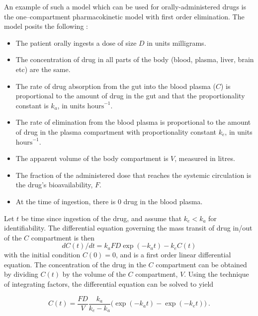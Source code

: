 An example of such a model which can be used for orally-administered drugs is the one--compartment pharmacokinetic model with first order elimination.  The model posits the following \cite{wakefield1992bayesian}:  
%
\begin{itemize}
	
\item The patient orally ingests a dose of size $D$ in units milligrams.

\item The concentration of drug in all parts of the body (blood, plasma, liver, brain etc) are the same.

\item The rate of drug absorption from the gut  into the blood plasma ($ C $) is proportional to the amount of drug in the gut and that the proportionality constant is $ k_a $, in units $ \text{hours}^{-1} $.

\item The rate of elimination from the blood plasma is proportional to the amount of drug in the plasma compartment with proportionality constant $ k_e $, in units $ \text{hours}^{-1} $.

\item The apparent volume of the body compartment is $V$, measured in litres.

\item The fraction of the administered dose that reaches the systemic circulation is the drug’s bioavailability, $F$.

\item At the time of ingestion, there is 0 drug in the blood plasma.
\end{itemize}

Let $t$ be time since ingestion of the drug, and assume that $k_e < k_a$ for identifiability.  The differential equation governing the mass transit of drug in/out of the $C$ compartment is then 
\begin{equation}  \label{pkpd_ode}
dC(t)/dt = k_aFD\exp(-k_a t) - k_eC(t) 
\end{equation}
\noindent with the initial condition $C(0) = 0$, and is a first order linear differential equation.  The concentration of the drug in the $C$ compartment can be obtained by dividing $C(t)$ by the volume of the $C$ compartment, $V$.  Using the technique of integrating factors, the differential equation can be solved to yield

\begin{equation}\label{onecompartment_PKPD_model}
	C(t) = \dfrac{F D}{V}\dfrac{k_a}{k_e - k_a}\Big(\exp(-k_at) - \exp(-k_et)\Big) \>.
\end{equation}

